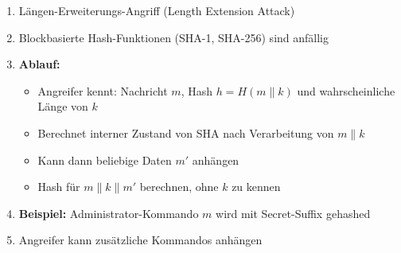 \documentclass[12pt,a4paper]{article}
\begin{document}
\begin{tcolorbox}[colback=solutionbg, colframe=black!30]
\begin{enumerate}[1.]
    \item Längen-Erweiterungs-Angriff (Length Extension Attack)
    \item Blockbasierte Hash-Funktionen (SHA-1, SHA-256) sind anfällig
    \item \textbf{Ablauf:}
    \begin{itemize}
        \item Angreifer kennt: Nachricht $m$, Hash $h = H(m \| k)$ und wahrscheinliche Länge von $k$
        \item Berechnet interner Zustand von SHA nach Verarbeitung von $m \| k$
        \item Kann dann beliebige Daten $m'$ anhängen
        \item Hash für $m \| k \| m'$ berechnen, ohne $k$ zu kennen
    \end{itemize}
    \item \textbf{Beispiel:} Administrator-Kommando $m$ wird mit Secret-Suffix gehashed
    \item Angreifer kann zusätzliche Kommandos anhängen

\end{enumerate}

\end{tcolorbox}
\end{document}
